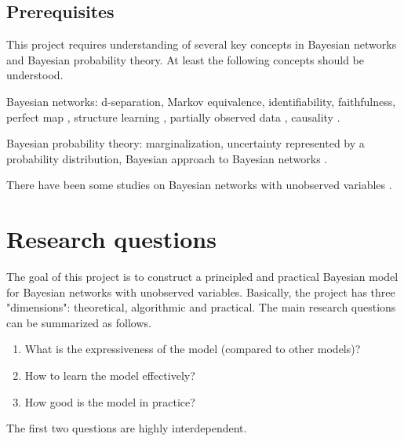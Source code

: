 \documentclass[]{article}
\begin{document}

\subsection{Prerequisites}

This project requires understanding of several key concepts in Bayesian networks and Bayesian probability theory. At least the following concepts should be understood.

Bayesian networks: d-separation, Markov equivalence, identifiability, faithfulness, perfect map \cite[ch. 3]{koller09}, structure learning \cite[ch. 18]{koller09}, partially observed data \cite[ch. 19.4, 19.5]{koller09}, causality \cite[ch. 21]{koller09}.

Bayesian probability theory: marginalization, uncertainty represented by a probability distribution, Bayesian approach to Bayesian networks \cite{friedman03}.

There have been some studies on Bayesian networks with unobserved variables \cite{boyen99, elidan00, elidan01, elidan05, friedman97b, friedman98, Friedman:1999vw, Geiger:1998tw, Kearns:1998wn, pellet08, Zhang:2004uh}. 



\section{Research questions}



The goal of this project is to construct a principled and practical Bayesian model for Bayesian networks with unobserved variables. Basically, the project has three "dimensions": theoretical, algorithmic and practical. The main research questions can be summarized as follows.

\begin{enumerate}
\item What is the expressiveness of the model (compared to other models)?
\item How to learn the model effectively?
\item How good is the model in practice?
\end{enumerate}

The first two questions are highly interdependent.



\end{document}
